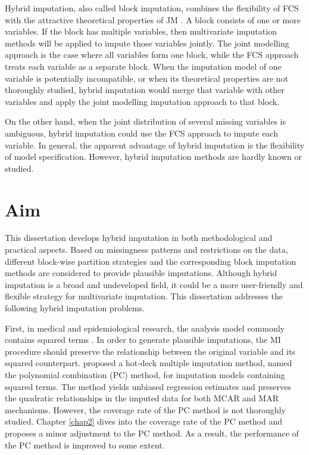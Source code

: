 Hybrid imputation, also called block imputation, combines the flexibility of FCS with the attractive theoretical properties of JM \citep{van2018JSM}. A block consists of one or more variables. If the block has multiple variables, then multivariate imputation methods will be applied to impute those variables jointly. The joint modelling approach is the case where all variables form one block, while the FCS approach treats each variable as a separate block. 
When the imputation model of one variable is potentially incompatible, or when its theoretical properties are not thoroughly studied, hybrid imputation would merge that variable with other variables and apply the joint modelling imputation approach to that block. 

On the other hand, when the joint distribution of several missing variables is ambiguous, hybrid imputation could use the FCS approach to impute each variable. In general, the apparent advantage of hybrid imputation is the flexibility of model specification. However, hybrid imputation methods are hardly known or studied. 

\section{Aim}
This dissertation develops hybrid imputation in both methodological and practical aspects. Based on missingness patterns and restrictions on the data, different block-wise partition strategies and the corresponding block imputation methods are considered to provide plausible imputations. Although hybrid imputation is a broad and undeveloped field, it could be a more user-friendly and flexible strategy for multivariate imputation. This dissertation addresses the following hybrid imputation problems. 

First, in medical and epidemiological research, the analysis model commonly contains squared terms \citep{seaman2012multiple, bartlett2015multiple}. In order to generate plausible imputations, the MI procedure should preserve the relationship between the original variable and its squared counterpart. \citet{Vink2013} proposed a hot-deck multiple imputation method, named the polynomial combination (PC) method, for imputation models containing squared terms. The method yields unbiased regression estimates and preserves the quadratic relationships in the imputed data for both MCAR and MAR mechanisms. However, the coverage rate of the PC method is not thoroughly studied. Chapter \ref{chap2} dives into the coverage rate of the PC method and proposes a minor adjustment to the PC method. As a result, the performance of the PC method is improved to some extent.  

